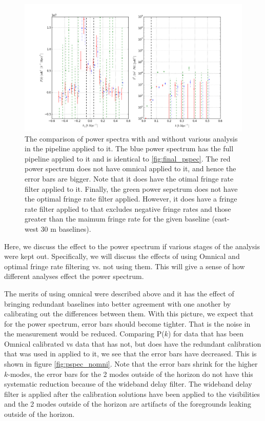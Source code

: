 \documentclass[twocolumn,numberedappendix]{emulateapj} \shorttitle{PSA64}
\begin{document}
\begin{figure}[t!]\centering
\includegraphics[width=1.5\columnwidth]{plots/pspec_comparison.png}
\caption{The comparison of power spectra with and without various analysis in
the pipeline applied to it. The blue power spectrum has the full pipeline
applied to it and is identical to \ref{fig:final_pspec}. The red power spectrum
does not have omnical applied to it, and hence the error bars are bigger. Note
that it does have the otimal fringe rate filter applied to it. Finally, the
green power sepctrum does not have the optimal fringe rate filter applied.
However, it does have a fringe rate filter applied to that excludes negative
fringe rates and those greater than the maimum fringe rate for the given
baseline (east-west 30 m baselines). }
\label{fig:pspec_comp}
\end{figure}

Here, we discuss the effect to the power spectrum if various stages of the
analysis were kept out. Specifically, we will discuss the effects of using
Omnical and optimal fringe rate filtering vs. not using them. This will give a
sense of how different analyses effect the power spectrum.

The merits of using omnical were described above and it has the effect of
bringing redundant baselines into better agreement with one another by
calibrating out the differences between them. With this picture, we expect
that for the power spectrum, error bars should become tighter. That is the
noise in the measurement would be reduced. Comparing P($k$) for data that has
been Omnical calibrated vs data that has not, but does have the redundant
calibration that was used in \cite{parsons_et_al2014} applied to it, we see that
the error bars have decreased. This is shown in figure \ref{fig:pspec_nomni}.
Note that the error bars shrink for the higher $k$-modes, the error bars for the
2 modes outside of the horizon do not have this systematic reduction because of
the wideband delay filter. The wideband delay filter is applied after the
calibration solutions have been applied to the visibilities and the 2 modes
outside of the horizon are artifacts of the foregrounds leaking outside of the
horizon. 
\end{document}
